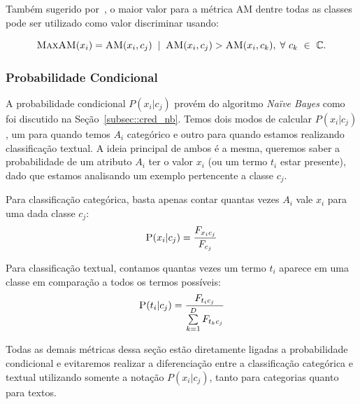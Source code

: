 Também sugerido por~\cite{Mengle08}, o maior valor para a métrica \textsc{AM} dentre todas as classes pode ser utilizado como valor discriminar usando:
 
 \begin{equation}\label{eqn::maxdom}
 \textsc{MaxAM}(x_i) = \textsc{AM}(x_i,c_j) \; \; | \;\; \textsc{AM}(x_i, c_j) > \textsc{AM}(x_i, c_k), \; \forall\ c_k\ \in\ \mathbb{C}.
\end{equation}


\subsubsection{Probabilidade Condicional} %
\label{subsubsection::pc}

A probabilidade condicional $P(x_i|c_j)$ provém do algoritmo \textit{Naïve Bayes} como foi discutido na Seção~\ref{subsec::cred_nb}.
Temos dois modos de calcular $P(x_i|c_j)$, um para quando temos $A_i$ categórico e outro para quando estamos realizando classificação textual.
A ideia principal de ambos é a mesma, queremos saber a probabilidade de um atributo $A_i$ ter o valor $x_i$ (ou um termo $t_i$ estar presente), dado que estamos analisando um exemplo pertencente a classe $c_j$.

Para classificação categórica, basta apenas contar quantas vezes $A_i$ vale $x_i$ para uma dada classe $c_j$:
    \begin{equation}\label{eqn::nbcattexto}
        \textsc{P}(x_i|c_j) = \frac{ F_{x_{i}c_{j}} }{ F_{c_{j}} } 
    \end{equation}
        
Para classificação textual, contamos quantas vezes um termo $t_i$ aparece em uma classe em comparação a todos os termos possíveis:
    \begin{equation}\label{eqn::nbcattexto}
       \textsc{P}(t_i|c_j) = \frac{ F_{t_{i}c_{j}} }{ \sum\limits^{D}_{k = 1} {  F_{t_{k}c_{j}}} } 
    \end{equation}

Todas as demais métricas dessa seção estão diretamente ligadas a probabilidade condicional e evitaremos realizar a diferenciação entre a classificação categórica e textual utilizando somente a notação $P(x_i|c_j)$, tanto para categorias quanto para textos.


